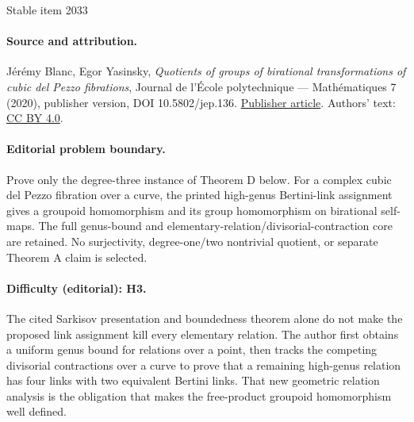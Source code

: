 \documentclass[11pt]{article}
\numberwithin{equation}{section}
\begin{document}
\begin{center}{\Large Stable item 2033}\end{center}
\paragraph{Source and attribution.}
Jérémy Blanc, Egor Yasinsky, \emph{Quotients of groups of birational transformations of cubic del Pezzo fibrations}, Journal de l’École polytechnique — Mathématiques 7 (2020), publisher version, DOI 10.5802/jep.136. \href{https://jep.centre-mersenne.org/articles/10.5802/jep.136/}{Publisher article}. Authors' text: \href{https://creativecommons.org/licenses/by/4.0/}{CC BY 4.0}.
\paragraph{Editorial problem boundary.}
Prove only the degree-three instance of Theorem D below. For a complex cubic del Pezzo fibration over a curve, the printed high-genus Bertini-link assignment gives a groupoid homomorphism and its group homomorphism on birational self-maps. The full genus-bound and elementary-relation/divisorial-contraction core are retained. No surjectivity, degree-one/two nontrivial quotient, or separate Theorem A claim is selected.
\paragraph{Difficulty (editorial): H3.}
The cited Sarkisov presentation and boundedness theorem alone do not make the proposed link assignment kill every elementary relation. The author first obtains a uniform genus bound for relations over a point, then tracks the competing divisorial contractions over a curve to prove that a remaining high-genus relation has four links with two equivalent Bertini links. That new geometric relation analysis is the obligation that makes the free-product groupoid homomorphism well defined.
\end{document}
